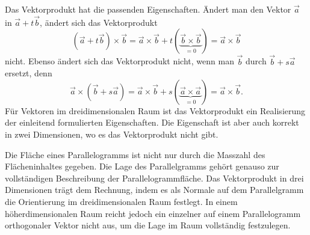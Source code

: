 Das Vektorprodukt hat die passenden Eigenschaften.
Ändert man den Vektor $\vec{a}$ in $\vec{a}+t\vec{b}$, ändert sich das
Vektorprodukt
\begin{equation}
(\vec{a}+t\vec{b})\times\vec{b}
=
\vec{a}\times\vec{b} + t(\underbrace{\vec{b}\times\vec{b}}_{\displaystyle=0})
=
\vec{a}\times\vec{b}
\label{buch:green:2vektoren:eqn:parallelogramm1}
\end{equation}
nicht.
Ebenso ändert sich das Vektorprodukt nicht, wenn man $\vec{b}$ durch
$\vec{b}+s\vec{a}$ ersetzt, denn
\begin{equation}
\vec{a}\times(\vec{b}+s\vec{a})
=
\vec{a}\times\vec{b}
+
s(\underbrace{\vec{a}\times\vec{a}}_{\displaystyle=0})
=
\vec{a}\times\vec{b}.
\label{buch:green:2vektoren:eqn:parallelogramm2}
\end{equation}
Für Vektoren im dreidimensionalen Raum ist das Vektorprodukt ein 
Realisierung der einleitend formulierten Eigenschaften.
Die Eigenschaft ist aber auch korrekt in zwei Dimensionen, wo es
das Vektorprodukt nicht gibt.

Die Fläche eines Parallelogramms ist nicht nur durch die Masszahl
des Flächeninhaltes gegeben. 
Die Lage des Parallelgramms gehört genauso zur
vollständigen Beschreibung der Parallelogrammfläche.
Das Vektorprodukt in drei Dimensionen trägt dem Rechnung, indem
es als Normale auf dem Parallelgramm die Orientierung im dreidimensionalen
Raum festlegt.
In einem höherdimensionalen Raum reicht jedoch ein einzelner auf
einem Parallelogramm orthogonaler Vektor nicht aus, um die Lage im
Raum vollständig festzulegen.

